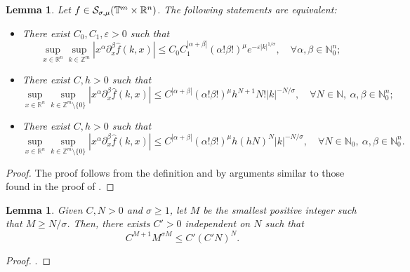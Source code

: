 \documentclass[11pt,reqno]{amsart}
\numberwithin{equation}{section}
\newtheorem{lemma}[theorem]{Lemma}
\theoremstyle{definition}
\theoremstyle{definition}
\newcommand{\G}{\mathnormal{\mathbb{T}^{m}\times\mathbb{R}^n}}
\newcommand{\R}{\mathbb{R}}
\newcommand{\Z}{\mathbb{Z}}
\newcommand{\N}{\mathbb{N}}
\renewcommand{\S}{\mathcal{S}_{\sigma,\mu}(\G)}
\begin{document}
    \begin{lemma}\label{lema331pet}
        Let $f\in\S$. The following statements are equivalent:
        \begin{itemize}
            \item[(i)] There exist $C_0,C_1,\varepsilon>0$ such that
            \[\sup_{x\in\R^n}\sup_{k\in\Z^m}|x^\alpha\partial_x^\beta \widehat{f}(k,x)|\leq C_0C_1^{|\alpha+\beta|}(\alpha!\beta!)^\mu e^{-\varepsilon|k|^{1/\sigma}},\quad\forall \alpha,\beta\in\N_0^n;\]
            
            \item[(ii)] There exist $C,h>0$ such that
            \[\sup_{x\in\R^n}\sup_{k\in\Z^m\setminus\{0\}}|x^\alpha\partial_x^\beta\widehat{f}(k,x)|\leq C^{|\alpha+\beta|}(\alpha!\beta!)^\mu h^{N+1}N!|k|^{-N/\sigma},\quad\forall N\in\N,\ \alpha,\beta\in\N_0^n;\]
            
            \item[(iii)] There exist $C,h>0$ such that
            \[\sup_{x\in\R^n}\sup_{k\in\Z^m\setminus\{0\}}|x^\alpha\partial_x^\beta\widehat{f}(k,x)|\leq C^{|\alpha+\beta|}(\alpha!\beta!)^\mu h(hN)^N|k|^{-N/\sigma},\quad\forall N\in\N_0,\ \alpha,\beta\in\N_0^n.\]
        \end{itemize}
    \end{lemma}
    \begin{proof}
    The proof follows from the definition and by arguments similar to those found in the proof of \cite[Lemma 1.6.2]{Rod_Gevrey}.
    \end{proof}

    \begin{lemma}\label{lema_petr}
        Given $C,N>0$ and $\sigma\geq 1$, let $M$ be the smallest positive integer such that $M\geq N/\sigma$. Then, there exists $C'>0$ independent on $N$ such that
        \[C^{M+1}M^{\sigma M}\leq C'(C'N)^N.\]
    \end{lemma}
    \begin{proof}
        \cite[Lemma 1.6.3]{Rod_Gevrey}.
    \end{proof}
    
\end{document}
